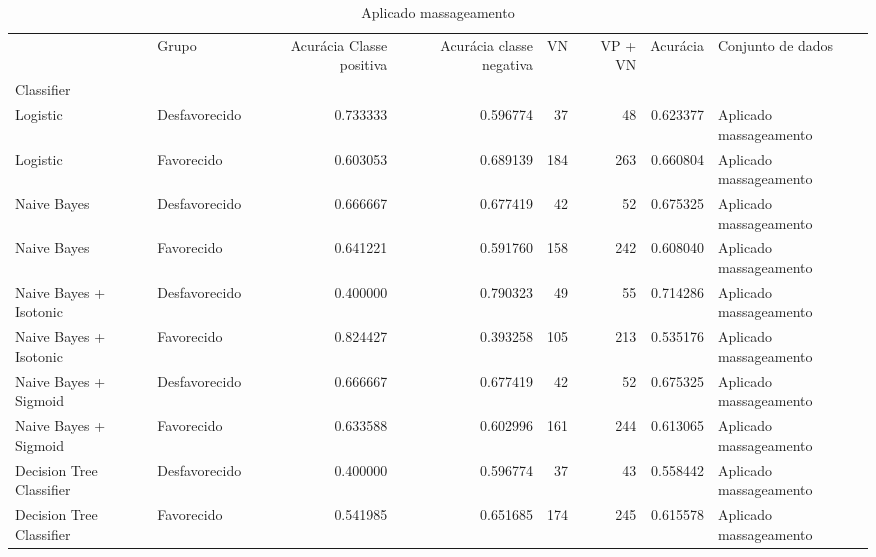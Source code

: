 \begin{table}
\centering
\caption{Aplicado massageamento}
\label{Aplicado massageamento 4}
\begin{tabular}{llrrrrrl}
\toprule
{} &          Grupo &  Acurácia Classe positiva &  Acurácia classe negativa &  VN  &  VP + VN  &  Acurácia &       Conjunto de dados \\
Classifier               &                &                           &                           &      &           &           &                         \\
\midrule
Logistic                 &  Desfavorecido &                  0.733333 &                  0.596774 &   37 &        48 &  0.623377 &  Aplicado massageamento \\
Logistic                 &     Favorecido &                  0.603053 &                  0.689139 &  184 &       263 &  0.660804 &  Aplicado massageamento \\
Naive Bayes              &  Desfavorecido &                  0.666667 &                  0.677419 &   42 &        52 &  0.675325 &  Aplicado massageamento \\
Naive Bayes              &     Favorecido &                  0.641221 &                  0.591760 &  158 &       242 &  0.608040 &  Aplicado massageamento \\
Naive Bayes + Isotonic   &  Desfavorecido &                  0.400000 &                  0.790323 &   49 &        55 &  0.714286 &  Aplicado massageamento \\
Naive Bayes + Isotonic   &     Favorecido &                  0.824427 &                  0.393258 &  105 &       213 &  0.535176 &  Aplicado massageamento \\
Naive Bayes + Sigmoid    &  Desfavorecido &                  0.666667 &                  0.677419 &   42 &        52 &  0.675325 &  Aplicado massageamento \\
Naive Bayes + Sigmoid    &     Favorecido &                  0.633588 &                  0.602996 &  161 &       244 &  0.613065 &  Aplicado massageamento \\
Decision Tree Classifier &  Desfavorecido &                  0.400000 &                  0.596774 &   37 &        43 &  0.558442 &  Aplicado massageamento \\
Decision Tree Classifier &     Favorecido &                  0.541985 &                  0.651685 &  174 &       245 &  0.615578 &  Aplicado massageamento \\
\bottomrule
\end{tabular}
\end{table}

